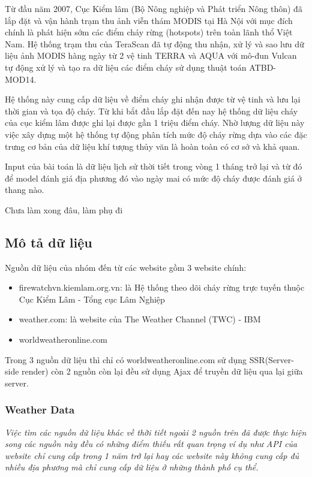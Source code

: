 \documentclass{article}
\begin{document}
Từ đầu năm 2007, Cục Kiểm lâm (Bộ Nông nghiệp và Phát triển Nông thôn) đã lắp đặt và vận hành trạm thu ảnh viễn thám MODIS tại Hà Nội với mục đích chính là phát hiện sớm các điểm cháy rừng (hotspots) trên toàn lãnh thổ Việt Nam. Hệ thống trạm thu của TeraScan đã tự động thu nhận, xử lý và sao lưu dữ liệu ảnh MODIS hàng ngày từ 2 vệ tinh TERRA và AQUA với mô-đun Vulcan tự động xử lý và tạo ra dữ liệu các điểm cháy sử dụng thuật toán ATBD-MOD14\cite{website:atbd-mod14}.

Hệ thống này cung cấp dữ liệu về điểm cháy ghi nhận được từ vệ tinh và lưu lại thời gian và tọa độ cháy. Từ khi bắt đầu lắp đặt đến nay hệ thống dữ liệu cháy của cục kiểm lâm được ghi lại được gần 1 triệu điểm cháy. Nhờ lượng dữ liệu này việc xây dựng một hệ thống tự động phân tích mức độ cháy rừng dựa vào các đặc trưng cơ bản của dữ liệu khí tượng thủy văn là hoàn toàn có cơ sở và khả quan.

Input của bài toán là dữ liệu lịch sử thời tiết trong vòng 1 tháng trở lại và từ đó để model đánh giá địa phương đó vào ngày mai có mức độ cháy được đánh giá ở thang nào.

Chưa làm xong đâu, làm phụ đi

\subsection{Mô tả dữ liệu}

Nguồn dữ liệu của nhóm đến từ các website gồm 3 website chính:

\begin{itemize}
	\item firewatchvn.kiemlam.org.vn: là Hệ thống theo dõi cháy rừng trực tuyến thuộc Cục Kiểm Lâm - Tổng cục Lâm Nghiệp
	\item weather.com: là website của The Weather Channel (TWC) - IBM\cite{website:wiki_twc}
	\item worldweatheronline.com
\end{itemize}

Trong 3 nguồn dữ liệu thì chỉ có worldweatheronline.com sử dụng SSR(Server-side render) còn 2 nguồn còn lại đều sử dụng Ajax để truyền dữ liệu qua lại giữa server.

\subsubsection{Weather Data}
\qquad\emph{Việc tìm các nguồn dữ liệu khác về thời tiết ngoài 2 nguồn trên đã được thực hiện song các nguồn này đều có những điểm thiếu rất quan trọng ví dụ như API của website chỉ cung cấp trong 1 năm trở lại hay các website này không cung cấp đủ nhiều địa phương mà chỉ cung cấp dữ liệu ở những thành phố cụ thể.}
\end{document}
